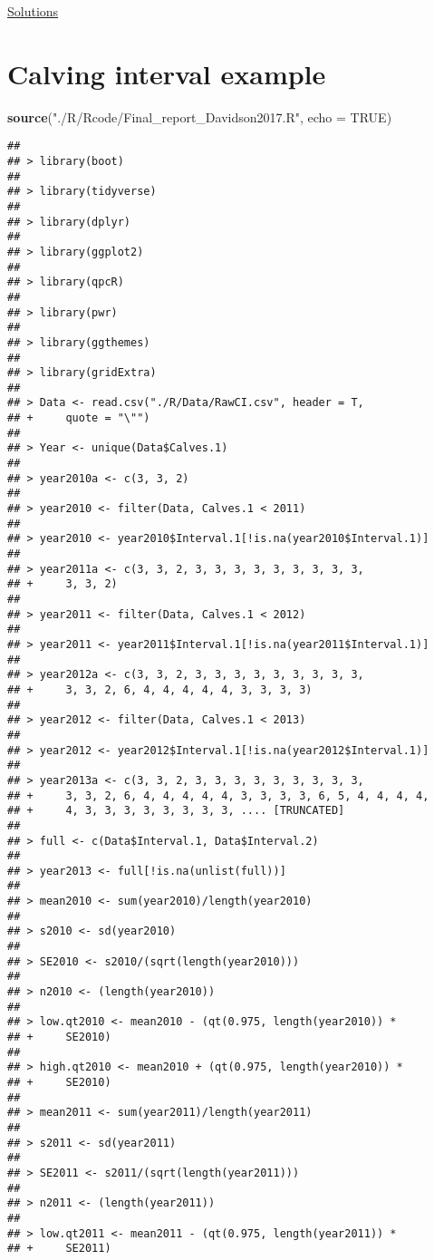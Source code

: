 \documentclass[]{book}
\newenvironment{Shaded}{\begin{snugshade}}{\end{snugshade}}
\newcommand{\DataTypeTok}[1]{\textcolor[rgb]{0.13,0.29,0.53}{#1}}
\newcommand{\KeywordTok}[1]{\textcolor[rgb]{0.13,0.29,0.53}{\textbf{#1}}}
\newcommand{\NormalTok}[1]{#1}
\newcommand{\OtherTok}[1]{\textcolor[rgb]{0.56,0.35,0.01}{#1}}
\newcommand{\StringTok}[1]{\textcolor[rgb]{0.31,0.60,0.02}{#1}}
\begin{document}
\protect\hyperlink{ex4f-answers}{Solutions}

\hypertarget{calves}{%
\chapter{Calving interval example}\label{calves}}

\begin{Shaded}
\begin{Highlighting}[]
\KeywordTok{source}\NormalTok{(}\StringTok{"./R/Rcode/Final_report_Davidson2017.R"}\NormalTok{, }\DataTypeTok{echo =} \OtherTok{TRUE}\NormalTok{)}
\end{Highlighting}
\end{Shaded}

\begin{verbatim}
## 
## > library(boot)
## 
## > library(tidyverse)
## 
## > library(dplyr)
## 
## > library(ggplot2)
## 
## > library(qpcR)
## 
## > library(pwr)
## 
## > library(ggthemes)
## 
## > library(gridExtra)
## 
## > Data <- read.csv("./R/Data/RawCI.csv", header = T, 
## +     quote = "\"")
## 
## > Year <- unique(Data$Calves.1)
## 
## > year2010a <- c(3, 3, 2)
## 
## > year2010 <- filter(Data, Calves.1 < 2011)
## 
## > year2010 <- year2010$Interval.1[!is.na(year2010$Interval.1)]
## 
## > year2011a <- c(3, 3, 2, 3, 3, 3, 3, 3, 3, 3, 3, 3, 
## +     3, 3, 2)
## 
## > year2011 <- filter(Data, Calves.1 < 2012)
## 
## > year2011 <- year2011$Interval.1[!is.na(year2011$Interval.1)]
## 
## > year2012a <- c(3, 3, 2, 3, 3, 3, 3, 3, 3, 3, 3, 3, 
## +     3, 3, 2, 6, 4, 4, 4, 4, 4, 3, 3, 3, 3)
## 
## > year2012 <- filter(Data, Calves.1 < 2013)
## 
## > year2012 <- year2012$Interval.1[!is.na(year2012$Interval.1)]
## 
## > year2013a <- c(3, 3, 2, 3, 3, 3, 3, 3, 3, 3, 3, 3, 
## +     3, 3, 2, 6, 4, 4, 4, 4, 4, 3, 3, 3, 3, 6, 5, 4, 4, 4, 4, 
## +     4, 3, 3, 3, 3, 3, 3, 3, 3, .... [TRUNCATED] 
## 
## > full <- c(Data$Interval.1, Data$Interval.2)
## 
## > year2013 <- full[!is.na(unlist(full))]
## 
## > mean2010 <- sum(year2010)/length(year2010)
## 
## > s2010 <- sd(year2010)
## 
## > SE2010 <- s2010/(sqrt(length(year2010)))
## 
## > n2010 <- (length(year2010))
## 
## > low.qt2010 <- mean2010 - (qt(0.975, length(year2010)) * 
## +     SE2010)
## 
## > high.qt2010 <- mean2010 + (qt(0.975, length(year2010)) * 
## +     SE2010)
## 
## > mean2011 <- sum(year2011)/length(year2011)
## 
## > s2011 <- sd(year2011)
## 
## > SE2011 <- s2011/(sqrt(length(year2011)))
## 
## > n2011 <- (length(year2011))
## 
## > low.qt2011 <- mean2011 - (qt(0.975, length(year2011)) * 
## +     SE2011)

\end{verbatim}
\end{document}
